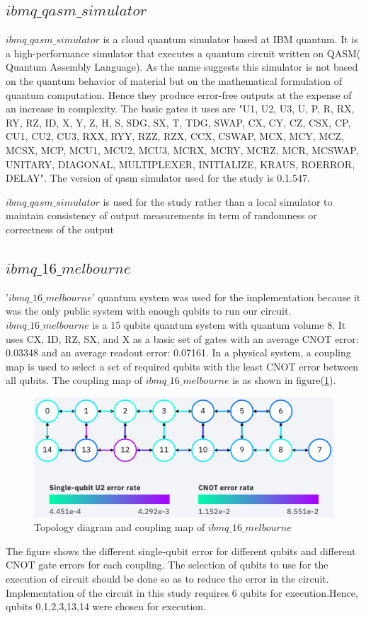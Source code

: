 \subsection{\textbf{$ibmq\_qasm\_simulator$}}
$ibmq\_qasm\_simulator$ is a cloud quantum simulator based at IBM quantum. It is a high-performance simulator that executes a quantum circuit written on QASM( Quantum Assembly Language). As the name suggests this simulator is not based on the quantum behavior of material but on the mathematical formulation of quantum computation. Hence they produce error-free outputs at the expense of an increase in complexity. The basic gates it uses are "U1, U2, U3, U, P, R, RX, RY, RZ, ID, X, Y, Z, H, S, SDG, SX, T, TDG, SWAP, CX, CY, CZ, CSX, CP, CU1, CU2, CU3, RXX, RYY, RZZ, RZX, CCX, CSWAP, MCX, MCY, MCZ, MCSX, MCP, MCU1, MCU2, MCU3, MCRX, MCRY, MCRZ, MCR, MCSWAP, UNITARY, DIAGONAL, MULTIPLEXER, INITIALIZE, KRAUS, ROERROR, DELAY"\cite{ibm_quantum_experience}. The version of qasm simulator used for the study is 0.1.547. 

$ibmq\_qasm\_simulator$ is used for the study rather than a local simulator to maintain consistency of output measurements in term of randomness or correctness of the output

\subsection{\textbf{$ibmq\_16\_melbourne$}}
'$ibmq\_16\_melbourne$' quantum system was used for the implementation because it was the only public system with enough qubits to run our circuit.
$ibmq\_16\_melbourne$ is a 15 qubits quantum system with quantum volume 8. It uses CX, ID, RZ, SX, and X as a basic set of gates with an average CNOT error: 0.03348 and an average readout error: 0.07161.\cite{ibm_quantum_experience} In a physical system, a coupling map is used to select a set of required qubits with the least CNOT error between all qubits. The coupling map of $ibmq\_16\_melbourne$ is as shown in figure(\ref{fig: coupling map_melbourne}).
\begin{figure}[H]
    \centering
    \includegraphics[width = \linewidth]{figures/coupling map_melbourne.png}
  \caption{Topology diagram and coupling map of $ibmq\_16\_melbourne$}
  \label{fig: coupling map_melbourne}
\end{figure}
The figure shows the different single-qubit error for different qubits and different CNOT gate errors for each coupling. The selection of qubits to use for the execution of circuit should be done so as to reduce the error in the circuit. Implementation of the circuit in this study requires 6 qubits for execution.Hence, qubits 0,1,2,3,13,14 were chosen for execution. 

